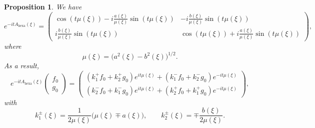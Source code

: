 \documentclass[10pt]{amsart}
\newtheorem{prop}[theorem]{Proposition}
\theoremstyle{definition}
\begin{document}
\begin{prop} \label{propeitA}
We have
\begin{equation}\label{expr_expo_A}
e^{-itA_{\mathrm{hexa}}(\xi)} = \begin{pmatrix} \cos(t\mu(\xi)) - i\frac{a(\xi)}{\mu(\xi)}\sin(t\mu(\xi)) & -i\frac{b(\xi)}{\mu(\xi)}\sin(t\mu(\xi)) \\[6pt] i\frac{b(\xi)}{\mu(\xi)}\sin(t\mu(\xi)) & \cos(t\mu(\xi)) + i\frac{a(\xi)}{\mu(\xi)}\sin(t\mu(\xi)) \end{pmatrix},
\end{equation}
where
\[
\mu(\xi)=\bigl(a^2(\xi)-b^2(\xi)\bigr)^{1/2}.
\]
As a result,
\begin{equation}\label{expr_sg_fg}
e^{-it A_{\mathrm{hexa}}(\xi)}\begin{pmatrix} {f}_0 \\ {g}_0 \end{pmatrix} = \begin{pmatrix} (k_1^{+}{f}_0+k_{2}^{+}{g}_0)e^{it\mu(\xi)} + (k_{1}^{-}{f}_0+k_2^{-}{g}_0)e^{-it\mu(\xi)} \\[6pt] (k_2^{-}{f}_0+k_1^{-}{g}_0)e^{it\mu(\xi)} + (k_{2}^{+}{f}_0+k_{1}^{+}{g}_0)e^{-it\mu(\xi)}\end{pmatrix},
\end{equation}
with
\begin{equation}\label{defK}
k_1^{\pm}(\xi) = \frac{1}{2\mu(\xi)}\bigl(\mu(\xi)\mp a(\xi)\bigr), \qquad k_2^{\pm}(\xi) = \mp\frac{b(\xi)}{2\mu(\xi)}.
\end{equation}
\end{prop}
\end{document}
